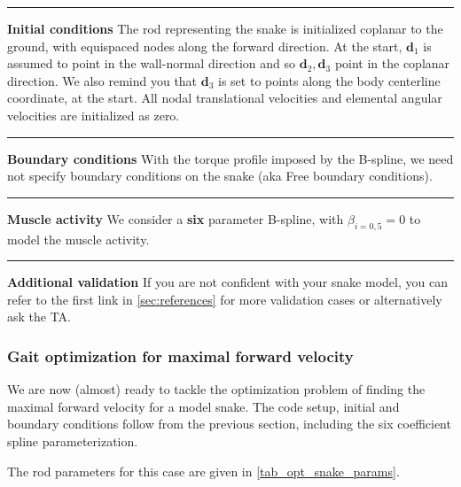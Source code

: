 \documentclass[11pt]{article}
\begin{document}
\noindent\rule{1\textwidth}{0.01pt}
\textbf{Initial conditions} The rod representing the snake is initialized coplanar
to the ground, with equispaced nodes along the forward direction. At the start, \(\mathbf{d}_1\) is assumed
to point in the wall-normal direction and so \(\mathbf{d}_2, \mathbf{d}_3\) point in the coplanar direction. We also remind you that \(\mathbf{d}_3\) is
set to points along the body centerline coordinate, at the start. All nodal
translational velocities and elemental angular velocities are initialized as zero.

\noindent\rule{1\textwidth}{0.01pt}
\textbf{Boundary conditions} With the torque profile imposed by the B-spline, we
need not specify boundary conditions on the snake (aka Free boundary conditions).

\noindent\rule{1\textwidth}{0.01pt}
\textbf{Muscle activity} We consider a \textbf{six} parameter B-spline,
with \(\beta_{i=0,5}=0\) to model the muscle activity.

\noindent\rule{1\textwidth}{0.01pt}
\textbf{Additional validation} If you are not confident with your snake model, you
can refer to the first link in \cref{sec:references} for more validation cases or alternatively
ask the TA.

\subsubsection{Gait optimization for maximal forward velocity}
\label{sec:orgd7a6243}
We are now (almost) ready to tackle the optimization problem of finding the
maximal forward velocity for a model snake. The code setup, initial and
boundary conditions follow from the previous section, including the
six coefficient spline parameterization.

The rod parameters for this case are given in \cref{tab_opt_snake_params}.
\end{document}
